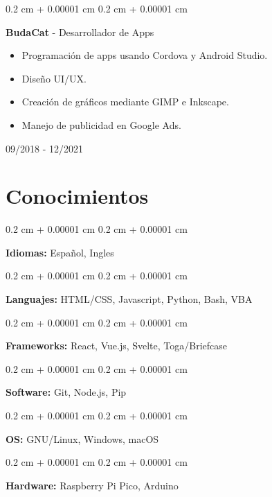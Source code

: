 \documentclass[12pt, letterpaper]{article}
\newenvironment{highlights}{
    \begin{itemize}[
        topsep=0.10 cm,
        parsep=0.10 cm,
        partopsep=0pt,
        itemsep=0pt,
        leftmargin=0.4 cm + 10pt
    ]
}{
    \end{itemize}
} %
\newenvironment{onecolentry}{
    \begin{adjustwidth}{
        0.2 cm + 0.00001 cm
    }{
        0.2 cm + 0.00001 cm
    }
}{
    \end{adjustwidth}
} %
\newenvironment{twocolentry}[2][]{
    \onecolentry
    \def\secondColumn{#2}
    \setcolumnwidth{\fill, 4.5 cm}
    \begin{paracol}{2}
}{
    \switchcolumn \raggedleft \secondColumn
    \end{paracol}
    \endonecolentry
} %
\begin{document}
\vspace{0.3 cm}

\begin{twocolentry}{

        09/2018 - 12/2021
    }
    \textbf{BudaCat} - Desarrollador de Apps
    \begin{highlights}
        \item Programación de apps usando Cordova y Android Studio.
        \item Diseño UI/UX.
        \item Creación de gráficos mediante GIMP e Inkscape.
        \item Manejo de publicidad en Google Ads.
    \end{highlights}
\end{twocolentry}

\vspace{0.5 cm}

\section{Conocimientos}

\vspace{0.2 cm}

\begin{onecolentry}
    \textbf{Idiomas:} Español, Ingles
\end{onecolentry}

\vspace{0.2 cm}

\begin{onecolentry}
    \textbf{Languajes:} HTML/CSS, Javascript, Python, Bash, VBA
\end{onecolentry}

\vspace{0.2 cm}

\begin{onecolentry}
    \textbf{Frameworks:} React, Vue.js, Svelte, Toga/Briefcase
\end{onecolentry}

\vspace{0.2 cm}

\begin{onecolentry}
    \textbf{Software:} Git, Node.js, Pip
\end{onecolentry}

\vspace{0.2 cm}

\begin{onecolentry}
    \textbf{OS:} GNU/Linux, Windows, macOS
\end{onecolentry}

\vspace{0.2 cm}

\begin{onecolentry}
    \textbf{Hardware:} Raspberry Pi Pico, Arduino
\end{onecolentry}
\end{document}
